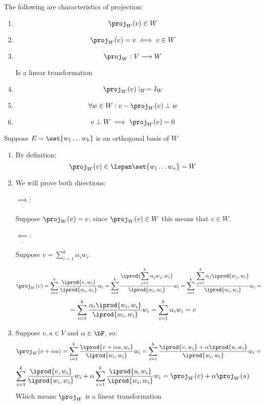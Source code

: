 \documentclass[10pt]{article}
\begin{document}
\begin{lemma*}{The following are characteristics of projection:
\begin{enumerate}
    \item \[ \proj_W(v)\in W \]
    \item \[ \proj_W(v)=v \iff v\in W \]
    \item \[ \proj_W:V\longrightarrow W \]
    \begin{center} Is a linear transformation \end{center}
    \item \[ \proj_W(v)\mid_W = I_W \]
    \item \[ \forall w\in W: v-\proj_W(v) \perp w \]
    \item \[ v\perp W\implies \proj_W(v) = 0 \]
\end{enumerate}}

Suppose $E=\set{w_1\dots w_k}$ is an orthogonal basis of $W$

\begin{enumerate}
    \item By definition:
    \[ \proj_W(v)\in\lspan\set{w_1\dots w_n} = W \]
    
    \item We will prove both directions:
    
    $\underline{\implies}$: \begin{minipage}[t]{\dimexpr\textwidth-3cm}
    
    Suppose $\displaystyle\proj_W(v)=v$, since $\displaystyle\proj_W(v)\in W$ this means that $v\in W$.
    
    \end{minipage}
    
    $\underline{\impliedby}$: \begin{minipage}[t]{\dimexpr\textwidth-3cm}
    
    Suppose $\displaystyle v=\sum_{i=1}^k\alpha_iw_i$.
    
    \[ \proj_W(v) = \sum_{i=1}^k\dfrac{\iprod{v,w_i}}{\iprod{w_i,w_i}}w_i = \sum_{i=1}^k\dfrac{\iprod{\displaystyle\sum_{j=1}^k\alpha_jw_j, w_i}}{\iprod{w_i,w_i}}w_i = \sum_{i=1}^k\dfrac{\displaystyle\sum_{j=1}^k\alpha_j\iprod{w_j,w_i}}{\iprod{w_i,w_i}}w_i = \]
    \[ = \sum_{i=1}^k\dfrac{\alpha_i\iprod{w_i,w_i}}{\iprod{w_i,w_i}}w_i = \sum_{i=1}^k\alpha_iw_i = v \]
    
    \end{minipage}
    
    \item Suppose $v,u\in V$ and $\alpha\in\bF$, so:
    \[ \proj_W(v+\alpha u) = \sum_{i=1}^k\dfrac{\iprod{v+\alpha u, w_i}}{\iprod{w_i,w_i}}w_i = \sum_{i=1}^k\dfrac{\iprod{v,w_i} + \alpha\iprod{u, w_i}}{\iprod{w_i,w_i}}w_i = \]
    \[ \sum_{i=1}^k\dfrac{\iprod{v,w_i}}{\iprod{w_i,w_i}}w_i + \alpha\sum_{i=1}^k\dfrac{\iprod{u,w_i}}{\iprod{w_i,w_i}}w_i = \proj_W(v)+\alpha\proj_W(u) \]
    Which means $\displaystyle\proj_W$ is a linear transformation
    

\end{enumerate}
\end{lemma*}
\end{document}
